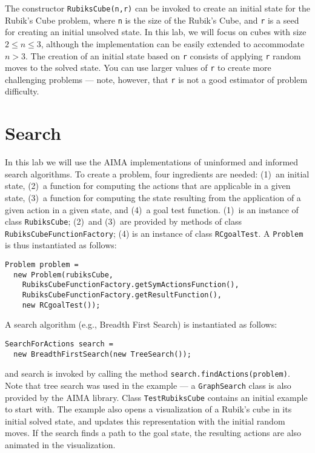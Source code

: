 \documentclass[a4paper]{article}
\begin{document}
The constructor {\tt RubiksCube(n,r)} can be invoked to create an initial state for the Rubik's Cube problem, where {\tt n} is the size of the Rubik's Cube, and {\tt r} is a seed for creating an initial unsolved state. In this lab, we will focus on cubes with size $2 \leq n \leq 3$, although the implementation can be easily extended to accommodate $n > 3$.  The creation of an initial state based on {\tt r} consists of applying {\tt r} random moves to the solved state.  You can use larger values of {\tt r} to create more challenging problems --- note, however, that {\tt r} is not a good estimator of problem difficulty.

\section{Search}
In this lab we will use the AIMA implementations of uninformed and informed search algorithms.  To create a problem, four ingredients are needed: (1)~an initial state, (2)~a function for computing the actions that are applicable in a given state, (3)~a function for computing the state resulting from the application of a given action in a given state, and (4)~a goal test function. (1)~is an instance of class {\tt RubiksCube}; (2)~and (3)~are provided by methods of class {\tt RubiksCubeFunctionFactory}; (4) is an instance of class {\tt RCgoalTest}. A {\tt Problem} is thus instantiated as follows:

\begin{lstlisting}
Problem problem =
  new Problem(rubiksCube,
    RubiksCubeFunctionFactory.getSymActionsFunction(),
    RubiksCubeFunctionFactory.getResultFunction(),
    new RCgoalTest());
\end{lstlisting}

\noindent A search algorithm (e.g., Breadth First Search) is instantiated as follows:

\begin{lstlisting}
SearchForActions search =
  new BreadthFirstSearch(new TreeSearch());
\end{lstlisting}

\noindent and search is invoked by calling the method {\tt search.findActions(problem)}.  Note that tree search was used in the example --- a {\tt GraphSearch} class is also provided by the AIMA library.  Class {\tt TestRubiksCube} contains an initial example to start with. The example also opens a visualization of a Rubik's cube in its initial solved state, and updates this representation with the initial random moves. If the search finds a path to the goal state, the resulting actions are also animated in the visualization. 
\end{document}
